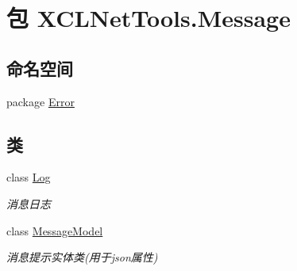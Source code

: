 \hypertarget{namespace_x_c_l_net_tools_1_1_message}{\section{包 X\-C\-L\-Net\-Tools.\-Message}
\label{namespace_x_c_l_net_tools_1_1_message}
}
\subsection*{命名空间}
\begin{DoxyCompactItemize}
\item 
package \hyperlink{namespace_x_c_l_net_tools_1_1_message_1_1_error}{Error}
\end{DoxyCompactItemize}
\subsection*{类}
\begin{DoxyCompactItemize}
\item 
class \hyperlink{class_x_c_l_net_tools_1_1_message_1_1_log}{Log}
\begin{DoxyCompactList}\small\item\em 消息日志 \end{DoxyCompactList}\item 
class \hyperlink{class_x_c_l_net_tools_1_1_message_1_1_message_model}{Message\-Model}
\begin{DoxyCompactList}\small\item\em 消息提示实体类(用于json属性) \end{DoxyCompactList}\end{DoxyCompactItemize}
